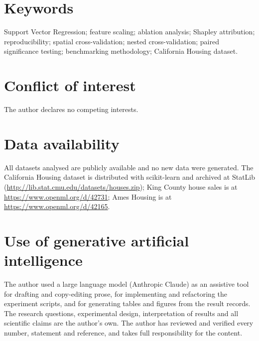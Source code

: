 \documentclass[11pt,a4paper]{article}
\begin{document}
\section{Keywords}
Support Vector Regression; feature scaling; ablation analysis; Shapley attribution;
reproducibility; spatial cross-validation; nested cross-validation; paired significance
testing; benchmarking methodology; California Housing dataset.

\section{Conflict of interest}
The author declares no competing interests.

\section{Data availability}
All datasets analysed are publicly available and no new data were generated. The California
Housing dataset is distributed with scikit-learn and archived at StatLib
(\url{http://lib.stat.cmu.edu/datasets/houses.zip}); King County house sales is at
\url{https://www.openml.org/d/42731}; Ames Housing is at \url{https://www.openml.org/d/42165}.

\section{Use of generative artificial intelligence}
The author used a large language model (Anthropic Claude) as an assistive tool for drafting
and copy-editing prose, for implementing and refactoring the experiment scripts, and for
generating tables and figures from the result records. The research questions, experimental
design, interpretation of results and all scientific claims are the author's own. The author
has reviewed and verified every number, statement and reference, and takes full responsibility
for the content.
\end{document}
